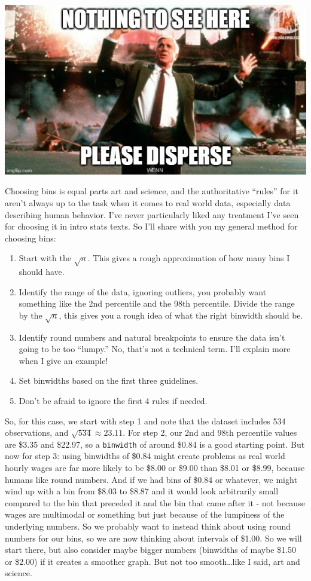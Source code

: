\documentclass[
  letterpaper,
]{book}
\providecommand{\tightlist}{%
  \setlength{\itemsep}{0pt}\setlength{\parskip}{0pt}}\usepackage{longtable,booktabs,array}
\begin{document}
\begin{center}
\includegraphics[width=0.75\linewidth,height=\textheight,keepaspectratio]{images/nothingtosee.jpg}
\end{center}

Choosing bins is equal parts art and science, and the authoritative
``rules'' for it aren't always up to the task when it comes to real
world data, especially data describing human behavior. I've never
particularly liked any treatment I've seen for choosing it in intro
stats texts. So I'll share with you my general method for choosing bins:

\begin{enumerate}
\def\labelenumi{\arabic{enumi}.}
\tightlist
\item
  Start with the \(\sqrt{n}\). This gives a rough approximation of how
  many bins I should have.
\item
  Identify the range of the data, ignoring outliers, you probably want
  something like the 2nd percentile and the 98th percentile. Divide the
  range by the \(\sqrt{n}\), this gives you a rough idea of what the
  right binwidth should be.
\item
  Identify round numbers and natural breakpoints to ensure the data
  isn't going to be too ``lumpy.'' No, that's not a technical term. I'll
  explain more when I give an example!
\item
  Set binwidths based on the first three guidelines.
\item
  Don't be afraid to ignore the first 4 rules if needed.
\end{enumerate}

So, for this case, we start with step 1 and note that the dataset
includes 534 observations, and \(\sqrt{534} \approx 23.11\). For step 2,
our 2nd and 98th percentile values are \$3.35 and \$22.97, so a
\texttt{binwidth} of around \$0.84 is a good starting point. But now for
step 3: using binwidths of \$0.84 might create problems as real world
hourly wages are far more likely to be \$8.00 or \$9.00 than \$8.01 or
\$8.99, because humans like round numbers. And if we had bins of \$0.84
or whatever, we might wind up with a bin from \$8.03 to \$8.87 and it
would look arbitrarily small compared to the bin that preceded it and
the bin that came after it - not because wages are multimodal or
something but just because of the lumpiness of the underlying numbers.
So we probably want to instead think about using round numbers for our
bins, so we are now thinking about intervals of \$1.00. So we will start
there, but also consider maybe bigger numbers (binwidths of maybe \$1.50
or \$2.00) if it creates a smoother graph. But not too smooth\ldots like
I said, art and science.
\end{document}
